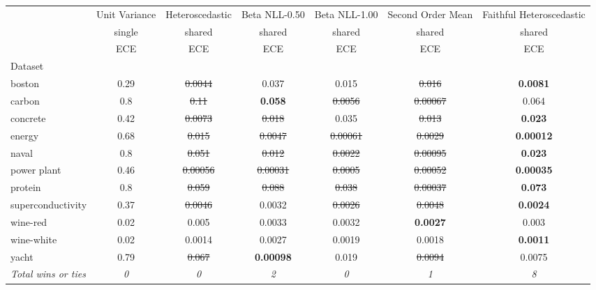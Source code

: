 \begin{tabular}{l|c|c|c|c|c|c}
\toprule
{} & {Unit Variance} & {Heteroscedastic} & {Beta NLL-0.50} & {Beta NLL-1.00} & {Second Order Mean} & {Faithful Heteroscedastic} \\
{} & {single} & {shared} & {shared} & {shared} & {shared} & {shared} \\
{} & {ECE} & {ECE} & {ECE} & {ECE} & {ECE} & {ECE} \\
{Dataset} & {} & {} & {} & {} & {} & {} \\
\midrule
boston & 0.29 & \sout{0.0044} & 0.037 & 0.015 & \sout{0.016} & \textbf{0.0081} \\
carbon & 0.8 & \sout{0.11} & \textbf{0.058} & \sout{0.0056} & \sout{0.00067} & 0.064 \\
concrete & 0.42 & \sout{0.0073} & \sout{0.018} & 0.035 & \sout{0.013} & \textbf{0.023} \\
energy & 0.68 & \sout{0.015} & \sout{0.0047} & \sout{0.00061} & \sout{0.0029} & \textbf{0.00012} \\
naval & 0.8 & \sout{0.051} & \sout{0.012} & \sout{0.0022} & \sout{0.00095} & \textbf{0.023} \\
power plant & 0.46 & \sout{0.00056} & \sout{0.00031} & \sout{0.0005} & \sout{0.00052} & \textbf{0.00035} \\
protein & 0.8 & \sout{0.059} & \sout{0.088} & \sout{0.038} & \sout{0.00037} & \textbf{0.073} \\
superconductivity & 0.37 & \sout{0.0046} & 0.0032 & \sout{0.0026} & \sout{0.0048} & \textbf{0.0024} \\
wine-red & 0.02 & 0.005 & 0.0033 & 0.0032 & \textbf{0.0027} & 0.003 \\
wine-white & 0.02 & 0.0014 & 0.0027 & 0.0019 & 0.0018 & \textbf{0.0011} \\
yacht & 0.79 & \sout{0.067} & \textbf{0.00098} & 0.019 & \sout{0.0094} & 0.0075 \\
\textit{{Total wins or ties}} & \textit{0} & \textit{0} & \textit{2} & \textit{0} & \textit{1} & \textit{8} \\
\bottomrule
\end{tabular}
